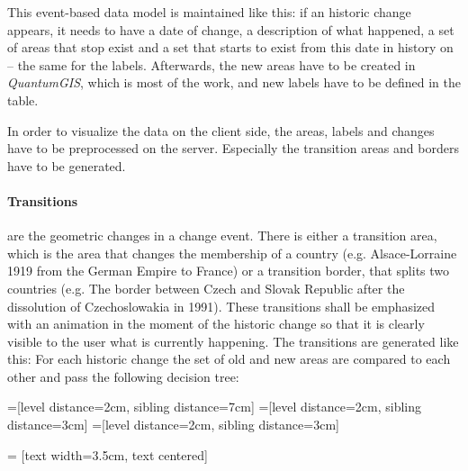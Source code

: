 This event-based data model is maintained like this: if an historic change appears, it needs to have a date of change, a description of what happened, a set of areas that stop exist and a set that starts to exist from this date in history on -- the same for the labels. Afterwards, the new areas have to be created in \textit{QuantumGIS}, which is most of the work, and new labels have to be defined in the table.

In order to visualize the data on the client side, the areas, labels and changes have to be preprocessed on the server. Especially the transition areas and borders have to be generated.

\newpage
\paragraph{Transitions} are the geometric changes in a change event. There is either a transition area, which is the area that changes the membership of a country (e.g. Alsace-Lorraine 1919 from the German Empire to France) or a transition border, that splits two countries (e.g. The border between Czech and Slovak Republic after the dissolution of Czechoslowakia in 1991). These transitions shall be emphasized with an animation in the moment of the historic change so that it is clearly visible to the user what is currently happening. The transitions are generated like this: For each historic change the set of old and new areas are compared to each other and pass the following decision tree:

=[level distance=2cm, sibling distance=7cm]
=[level distance=2cm, sibling distance=3cm]
=[level distance=2cm, sibling distance=3cm]

 = [text width=3.5cm, text centered]

